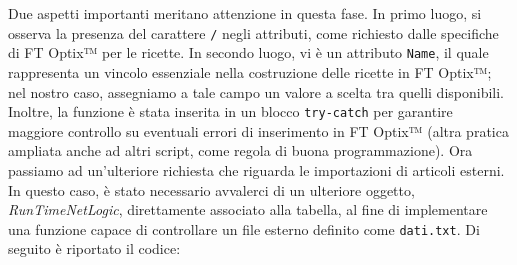 Due aspetti importanti meritano attenzione in questa fase. In primo luogo, si osserva la presenza del carattere \verb|/| negli attributi, come richiesto dalle specifiche di FT Optix™ per le ricette. In secondo luogo, vi è un attributo \verb|Name|, il quale rappresenta un vincolo essenziale nella costruzione delle ricette in FT Optix™; nel nostro caso, assegniamo a tale campo un valore a scelta tra quelli disponibili. Inoltre, la funzione è stata inserita in un blocco \verb|try-catch| per garantire maggiore controllo su eventuali errori di inserimento in FT Optix™ (altra pratica ampliata anche ad altri script, come regola di buona programmazione).
Ora passiamo ad un'ulteriore richiesta che riguarda le importazioni di articoli esterni. In questo caso, è stato necessario avvalerci di un ulteriore oggetto, \textit{RunTimeNetLogic}, direttamente associato alla tabella, al fine di implementare una funzione capace di controllare un file esterno definito come \verb|dati.txt|. Di seguito è riportato il codice:
